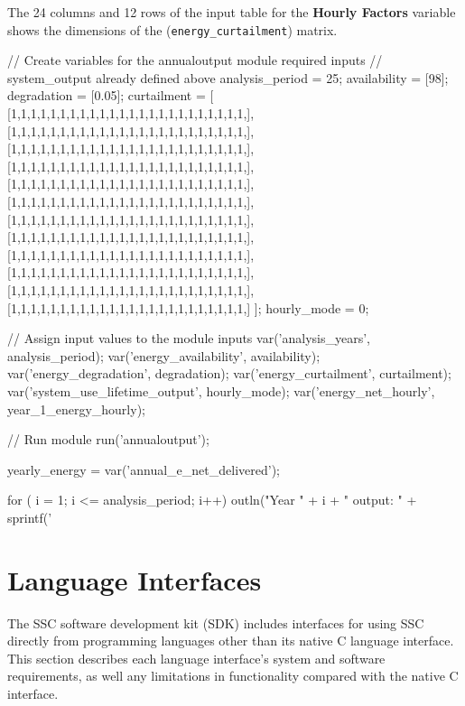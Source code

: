 \documentclass{article}
\begin{document}
The 24 columns and 12 rows of the input table for the \textbf{Hourly Factors} variable shows the dimensions of the (\texttt{energy\_curtailment}) matrix.

\begin{verbatimtab}

// Create variables for the annualoutput module required inputs
// system_output already defined above
analysis_period = 25;
availability = [98];
degradation = [0.05];
curtailment = [ [1,1,1,1,1,1,1,1,1,1,1,1,1,1,1,1,1,1,1,1,1,1,1,1,],
                [1,1,1,1,1,1,1,1,1,1,1,1,1,1,1,1,1,1,1,1,1,1,1,1,],
                [1,1,1,1,1,1,1,1,1,1,1,1,1,1,1,1,1,1,1,1,1,1,1,1,],
                [1,1,1,1,1,1,1,1,1,1,1,1,1,1,1,1,1,1,1,1,1,1,1,1,],
                [1,1,1,1,1,1,1,1,1,1,1,1,1,1,1,1,1,1,1,1,1,1,1,1,],
                [1,1,1,1,1,1,1,1,1,1,1,1,1,1,1,1,1,1,1,1,1,1,1,1,],
                [1,1,1,1,1,1,1,1,1,1,1,1,1,1,1,1,1,1,1,1,1,1,1,1,],
                [1,1,1,1,1,1,1,1,1,1,1,1,1,1,1,1,1,1,1,1,1,1,1,1,],
                [1,1,1,1,1,1,1,1,1,1,1,1,1,1,1,1,1,1,1,1,1,1,1,1,],
                [1,1,1,1,1,1,1,1,1,1,1,1,1,1,1,1,1,1,1,1,1,1,1,1,],
                [1,1,1,1,1,1,1,1,1,1,1,1,1,1,1,1,1,1,1,1,1,1,1,1,],
                [1,1,1,1,1,1,1,1,1,1,1,1,1,1,1,1,1,1,1,1,1,1,1,1,] ];
hourly_mode = 0;

// Assign input values to the module inputs
var('analysis_years', analysis_period);
var('energy_availability', availability);
var('energy_degradation', degradation);
var('energy_curtailment', curtailment);
var('system_use_lifetime_output', hourly_mode);
var('energy_net_hourly', year_1_energy_hourly);

// Run module
run('annualoutput');

yearly_energy = var('annual_e_net_delivered');

for ( i = 1; i <= analysis_period; i++)
{
  outln("Year " + i + " output: " + sprintf('%
}


\end{verbatimtab}

\section{Language Interfaces}
\label{sec_language_interfaces}

The SSC software development kit (SDK) includes interfaces for using SSC directly from programming languages other than its native C language interface.  This section describes each language interface's system and software requirements, as well any limitations in functionality compared with the native C interface.
\end{document}
